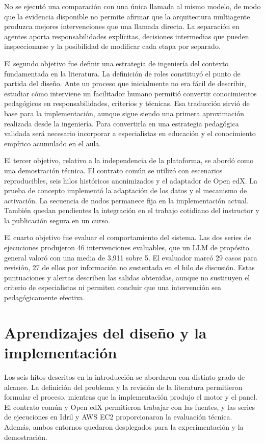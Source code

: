 No se ejecutó una comparación con una única llamada al mismo modelo, de modo que la evidencia disponible no permite afirmar que la arquitectura multiagente produzca mejores intervenciones que una llamada directa. La separación en agentes aporta responsabilidades explícitas, decisiones intermedias que pueden inspeccionarse y la posibilidad de modificar cada etapa por separado.

El segundo objetivo fue definir una estrategia de ingeniería del contexto fundamentada en la literatura. La definición de roles constituyó el punto de partida del diseño. Ante un proceso que inicialmente no era fácil de describir, estudiar cómo interviene un facilitador humano permitió convertir conocimientos pedagógicos en responsabilidades, criterios y técnicas. Esa traducción sirvió de base para la implementación, aunque sigue siendo una primera aproximación realizada desde la ingeniería. Para convertirla en una estrategia pedagógica validada será necesario incorporar a especialistas en educación y el conocimiento empírico acumulado en el aula.

El tercer objetivo, relativo a la independencia de la plataforma, se abordó como una demostración técnica. El contrato común se utilizó con escenarios reproducibles, seis hilos históricos anonimizados y el adaptador de Open edX. La prueba de concepto implementó la adaptación de los datos y el mecanismo de activación. La secuencia de nodos permanece fija en la implementación actual. También quedan pendientes la integración en el trabajo cotidiano del instructor y la publicación segura en un curso.

El cuarto objetivo fue evaluar el comportamiento del sistema. Las dos series de ejecuciones produjeron 46 intervenciones evaluables, que un LLM de propósito general valoró con una media de 3,911 sobre 5. El evaluador marcó 29 casos para revisión, 27 de ellos por información no sustentada en el hilo de discusión. Estas puntuaciones y alertas describen las salidas obtenidas, aunque no sustituyen el criterio de especialistas ni permiten concluir que una intervención sea pedagógicamente efectiva.

\section{Aprendizajes del diseño y la implementación}

Los seis hitos descritos en la introducción se abordaron con distinto grado de alcance. La definición del problema y la revisión de la literatura permitieron formular el proceso, mientras que la implementación produjo el motor y el panel. El contrato común y Open edX permitieron trabajar con las fuentes, y las series de ejecuciones en Idril y AWS EC2 proporcionaron la evaluación técnica. Además, ambos entornos quedaron desplegados para la experimentación y la demostración.

